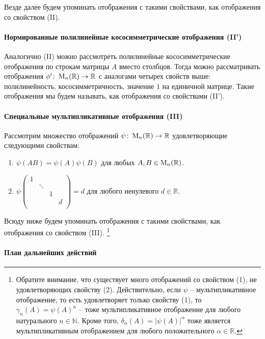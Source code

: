 Везде далее будем упоминать отображения с такими свойствами, как отображения со свойством (II).

\paragraph{Нормированные полилинейные кососимметрические отображения (II')}

Аналогично (II) можно рассмотреть полилинейные кососимметрические отображения по строкам матрицы $A$ вместо столбцов.
Тогда можно рассматривать отображения $\phi'\colon \operatorname{M}_{n}(\mathbb R)\to \mathbb R$ с аналогами четырех свойств выше: полилинейность, кососимметричность, значение $1$ на единичной матрице.
Такие отображения мы будем называть, как отображения со свойствами (II').

\paragraph{Специальные мультипликативные отображения (III)} 

Рассмотрим множество отображений $\psi\colon \operatorname{M}_{n}(\mathbb R)\to \mathbb R$ удовлетворяющие следующими свойствам:
\begin{enumerate}
\item $\psi(AB) = \psi(A)\psi(B)$ для любых $A,B\in\operatorname{M}_{n}(\mathbb R)$.

\item 
$
\psi
\begin{pmatrix}
{1}&{}&{}&{}\\
{}&{\ddots}&{}&{}\\
{}&{}&{1}&{}\\
{}&{}&{}&{d}\\
\end{pmatrix}
= 
d
$ для любого ненулевого $d\in\mathbb R$.
\end{enumerate}
Всюду ниже будем упоминать отображения с такими свойствами, как отображения со свойством (III).%
\footnote{Обратите внимание, что существует много отображений со свойством (1), не удовлетворяющих свойству (2).
Действительно, если $\psi$ -- мультипликативное отображение, то есть удовлетворяет только свойству (1), то $\gamma_n(A) = \psi(A)^n$ -- тоже мультипликативное отображение для любого натурального $n\in \mathbb N$.
Кроме того, $\delta_\alpha(A) = |\psi(A)|^\alpha$ тоже является мультипликативным отображением для любого положительного $\alpha\in \mathbb R$.}

\paragraph{План дальнейших действий} 

